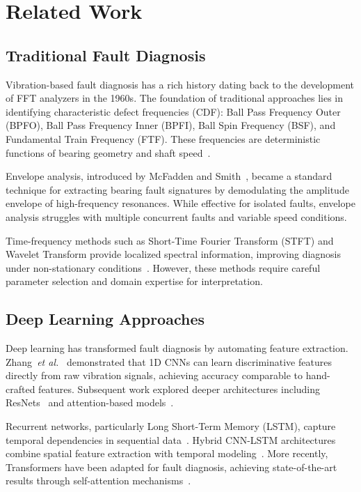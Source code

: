 \documentclass[journal]{IEEEtran}
\begin{document}
\section{Related Work}
\label{sec:related}

\subsection{Traditional Fault Diagnosis}

Vibration-based fault diagnosis has a rich history dating back to the
development of FFT analyzers in the 1960s. The foundation of traditional
approaches lies in identifying characteristic defect frequencies (CDF):
Ball Pass Frequency Outer (BPFO), Ball Pass Frequency Inner (BPFI), Ball
Spin Frequency (BSF), and Fundamental Train Frequency (FTF). These frequencies
are deterministic functions of bearing geometry and shaft speed~\cite{harris2001rolling}.

Envelope analysis, introduced by McFadden and Smith~\cite{mcfadden1984vibration},
became a standard technique for extracting bearing fault signatures by
demodulating the amplitude envelope of high-frequency resonances. While
effective for isolated faults, envelope analysis struggles with multiple
concurrent faults and variable speed conditions.

Time-frequency methods such as Short-Time Fourier Transform (STFT) and
Wavelet Transform provide localized spectral information, improving diagnosis
under non-stationary conditions~\cite{peng2004application}. However, these
methods require careful parameter selection and domain expertise for
interpretation.

\subsection{Deep Learning Approaches}

Deep learning has transformed fault diagnosis by automating feature extraction.
Zhang~\textit{et al.}~\cite{zhang2017cnn} demonstrated that 1D CNNs can learn
discriminative features directly from raw vibration signals, achieving accuracy
comparable to hand-crafted features. Subsequent work explored deeper
architectures including ResNets~\cite{zhao2018deep} and attention-based
models~\cite{li2020attention}.

Recurrent networks, particularly Long Short-Term Memory (LSTM), capture
temporal dependencies in sequential data~\cite{zhao2017lstm}. Hybrid
CNN-LSTM architectures combine spatial feature extraction with temporal
modeling~\cite{chen2021bearing}. More recently, Transformers have been
adapted for fault diagnosis, achieving state-of-the-art results through
self-attention mechanisms~\cite{ding2022transformer}.
\end{document}
